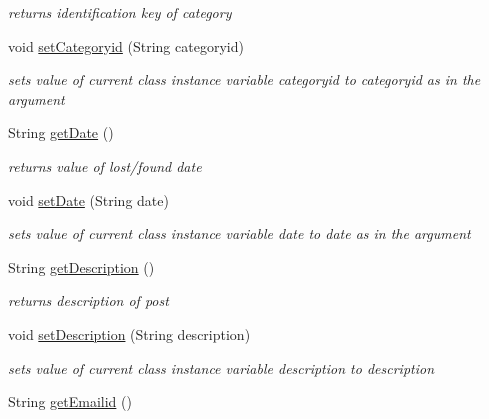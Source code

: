 \begin{DoxyCompactItemize}
\begin{DoxyCompactList}\small\item\em returns identification key of category \end{DoxyCompactList}\item 
void \hyperlink{classcom_1_1example_1_1sel_1_1lostfound_1_1Posts_acddafa54e3c47731c23140baa44cc5f7}{set\+Categoryid} (String categoryid)
\begin{DoxyCompactList}\small\item\em sets value of current class instance variable categoryid to categoryid as in the argument \end{DoxyCompactList}\item 
String \hyperlink{classcom_1_1example_1_1sel_1_1lostfound_1_1Posts_a48289c70fa035673575e948b60fef456}{get\+Date} ()\hypertarget{classcom_1_1example_1_1sel_1_1lostfound_1_1Posts_a48289c70fa035673575e948b60fef456}{}\label{classcom_1_1example_1_1sel_1_1lostfound_1_1Posts_a48289c70fa035673575e948b60fef456}

\begin{DoxyCompactList}\small\item\em returns value of lost/found date \end{DoxyCompactList}\item 
void \hyperlink{classcom_1_1example_1_1sel_1_1lostfound_1_1Posts_af6064c421253492306e1eb896e190612}{set\+Date} (String date)
\begin{DoxyCompactList}\small\item\em sets value of current class instance variable date to date as in the argument \end{DoxyCompactList}\item 
String \hyperlink{classcom_1_1example_1_1sel_1_1lostfound_1_1Posts_a29b12fbb98f54b0b154df4e671c0e322}{get\+Description} ()\hypertarget{classcom_1_1example_1_1sel_1_1lostfound_1_1Posts_a29b12fbb98f54b0b154df4e671c0e322}{}\label{classcom_1_1example_1_1sel_1_1lostfound_1_1Posts_a29b12fbb98f54b0b154df4e671c0e322}

\begin{DoxyCompactList}\small\item\em returns description of post \end{DoxyCompactList}\item 
void \hyperlink{classcom_1_1example_1_1sel_1_1lostfound_1_1Posts_a87b84ac76aa2e515539c56dae47deb0e}{set\+Description} (String description)
\begin{DoxyCompactList}\small\item\em sets value of current class instance variable description to description \end{DoxyCompactList}\item 
String \hyperlink{classcom_1_1example_1_1sel_1_1lostfound_1_1Posts_a5e2d129ec9e284266903f74ae62204f7}{get\+Emailid} ()\hypertarget{classcom_1_1example_1_1sel_1_1lostfound_1_1Posts_a5e2d129ec9e284266903f74ae62204f7}{}\label{classcom_1_1example_1_1sel_1_1lostfound_1_1Posts_a5e2d129ec9e284266903f74ae62204f7}


\end{DoxyCompactItemize}
